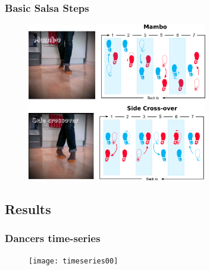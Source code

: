\documentclass{beamer}
\begin{document}
\begin{frame}
\frametitle{Basic Salsa Steps}
\vspace{-0.7cm}


\begin{figure}[!htb]
\centering    
\includegraphics[width=0.7\textwidth]{steps00}
\caption[PA]{}
  
\label{fig:sn}
\end{figure}



\end{frame}



\subsection{Results}




 

\begin{frame}
\frametitle{Dancers time-series}
\vspace{-0.7cm}


\begin{figure}[!htb]
\centering    
\texttt{[image: timeseries00]}
\caption[PA]{}
  
\label{fig:sn}
\end{figure}



\end{frame}



 
 
\end{document}
